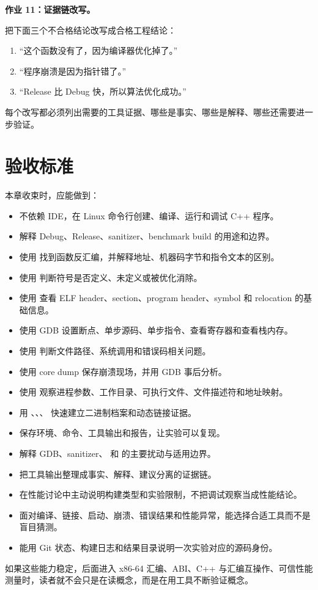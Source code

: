 \begin{exercisebox}
\textbf{作业 11：证据链改写。}

把下面三个不合格结论改写成合格工程结论：

\begin{enumerate}
  \item “这个函数没有了，因为编译器优化掉了。”
  \item “程序崩溃是因为指针错了。”
  \item “Release 比 Debug 快，所以算法优化成功。”
\end{enumerate}

每个改写都必须列出需要的工具证据、哪些是事实、哪些是解释、哪些还需要进一步验证。
\end{exercisebox}

\section{验收标准}

本章收束时，应能做到：

\begin{itemize}
  \item 不依赖 IDE，在 Linux 命令行创建、编译、运行和调试 C++ 程序。
  \item 解释 Debug、Release、sanitizer、benchmark build 的用途和边界。
  \item 使用  找到函数反汇编，并解释地址、机器码字节和指令文本的区别。
  \item 使用  判断符号是否定义、未定义或被优化消除。
  \item 使用  查看 ELF header、section、program header、symbol 和 relocation 的基础信息。
  \item 使用 GDB 设置断点、单步源码、单步指令、查看寄存器和查看栈内存。
  \item 使用  判断文件路径、系统调用和错误码相关问题。
  \item 使用 core dump 保存崩溃现场，并用 GDB 事后分析。
  \item 使用  观察进程参数、工作目录、可执行文件、文件描述符和地址映射。
  \item 用 、、、 快速建立二进制档案和动态链接证据。
  \item 保存环境、命令、工具输出和报告，让实验可以复现。
  \item 解释 GDB、sanitizer、 和  的主要扰动与适用边界。
  \item 把工具输出整理成事实、解释、建议分离的证据链。
  \item 在性能讨论中主动说明构建类型和实验限制，不把调试观察当成性能结论。
  \item 面对编译、链接、启动、崩溃、错误结果和性能异常，能选择合适工具而不是盲目猜测。
  \item 能用 Git 状态、构建日志和结果目录说明一次实验对应的源码身份。
\end{itemize}

如果这些能力稳定，后面进入 x86-64 汇编、ABI、C++ 与汇编互操作、可信性能测量时，读者就不会只是在读概念，而是在用工具不断验证概念。
